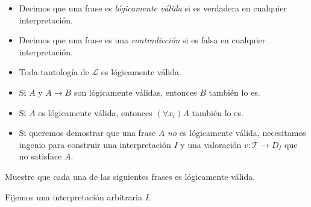 \begin{definition}
\leavevmode
\begin{itemize}
    \item Decimos que una frase es \textit{lógicamente válida} si es verdadera en cualquier interpretación.
    \item Decimos que una frase es una \textit{contradicción} si es falsa en cualquier interpretación.
\end{itemize}
\end{definition}

\begin{remarks}
\leavevmode
\begin{itemize}
    \item Toda tautología de $\mathscr L$ es lógicamente válida.
    \item Si $A$ y $A \to B$ son lógicamente válidas, entonces $B$ también lo es.
    \item Si $A$ es lógicamente válida, entonces $(\forall x_i) A$ también lo es.
    \item Si queremos demostrar que una frase $A$ \textit{no} es lógicamente válida, necesitamos ingenio para construir una interpretación $I$ y una valoración $v : \mathscr T \to D_I$ que no satisface $A$.
\end{itemize}
\end{remarks}

\begin{exercise}
Muestre que cada una de las siguientes frases es lógicamente válida.
\end{exercise}

\begin{remark}
Fijemos una interpretación arbitraria $I$.
\end{remark}

